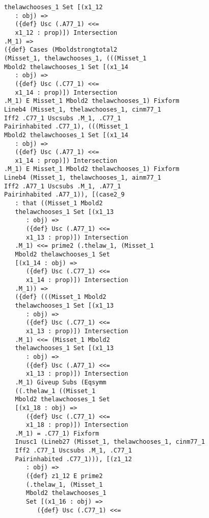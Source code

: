 \documentclass[12pt]{article}
\begin{document}
\begin{verbatim}
             thelawchooses_1 Set [(x1_12 
                : obj) => 
                ({def} Usc (.A77_1) <<= 
                x1_12 : prop)]) Intersection 
             .M_1) => 
             ({def} Cases (Mboldstrongtotal2 
             (Misset_1, thelawchooses_1, (((Misset_1 
             Mbold2 thelawchooses_1 Set [(x1_14 
                : obj) => 
                ({def} Usc (.C77_1) <<= 
                x1_14 : prop)]) Intersection 
             .M_1) E Misset_1 Mbold2 thelawchooses_1) Fixform 
             Lineb4 (Misset_1, thelawchooses_1, cinm77_1 
             Iff2 .C77_1 Uscsubs .M_1, .C77_1 
             Pairinhabited .C77_1), (((Misset_1 
             Mbold2 thelawchooses_1 Set [(x1_14 
                : obj) => 
                ({def} Usc (.A77_1) <<= 
                x1_14 : prop)]) Intersection 
             .M_1) E Misset_1 Mbold2 thelawchooses_1) Fixform 
             Lineb4 (Misset_1, thelawchooses_1, ainm77_1 
             Iff2 .A77_1 Uscsubs .M_1, .A77_1 
             Pairinhabited .A77_1)), [(case2_9 
                : that ((Misset_1 Mbold2 
                thelawchooses_1 Set [(x1_13 
                   : obj) => 
                   ({def} Usc (.A77_1) <<= 
                   x1_13 : prop)]) Intersection 
                .M_1) <<= prime2 (.thelaw_1, (Misset_1 
                Mbold2 thelawchooses_1 Set 
                [(x1_14 : obj) => 
                   ({def} Usc (.C77_1) <<= 
                   x1_14 : prop)]) Intersection 
                .M_1)) => 
                ({def} (((Misset_1 Mbold2 
                thelawchooses_1 Set [(x1_13 
                   : obj) => 
                   ({def} Usc (.C77_1) <<= 
                   x1_13 : prop)]) Intersection 
                .M_1) <<= (Misset_1 Mbold2 
                thelawchooses_1 Set [(x1_13 
                   : obj) => 
                   ({def} Usc (.A77_1) <<= 
                   x1_13 : prop)]) Intersection 
                .M_1) Giveup Subs (Eqsymm 
                ((.thelaw_1 ((Misset_1 
                Mbold2 thelawchooses_1 Set 
                [(x1_18 : obj) => 
                   ({def} Usc (.C77_1) <<= 
                   x1_18 : prop)]) Intersection 
                .M_1) = .C77_1) Fixform 
                Inusc1 (Lineb27 (Misset_1, thelawchooses_1, cinm77_1 
                Iff2 .C77_1 Uscsubs .M_1, .C77_1 
                Pairinhabited .C77_1))), [(z1_12 
                   : obj) => 
                   ({def} z1_12 E prime2 
                   (.thelaw_1, (Misset_1 
                   Mbold2 thelawchooses_1 
                   Set [(x1_16 : obj) => 
                      ({def} Usc (.C77_1) <<= 

\end{verbatim}
\end{document}
